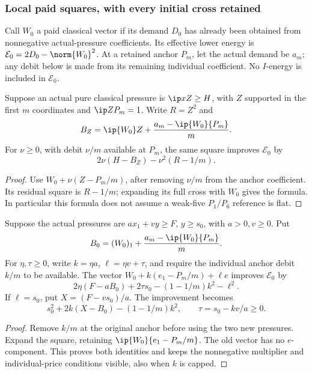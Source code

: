 \subsubsection{Local paid squares, with every initial cross retained}
Call \(W_0\) a paid classical vector if its demand \(D_0\) has already
been obtained from nonnegative actual-pressure coefficients. Its effective
lower energy is \(\mathcal E_0=2D_0-\norm{W_0}^2\).
At a retained anchor \(P_m\), let the actual demand be \(a_m\);
any debit below is made from its remaining individual coefficient.
No \(I\)-energy is included in \(\mathcal E_0\).

\begin{lemma}
\label{lem:I-head-paid-square}
Suppose an actual pure classical pressure is
\(\ip xZ\ge H\), with \(Z\) supported in the first \(m\) coordinates
and \(\ip Z{P_m}=1\). Write \(R=Z^2\) and
\[
 B_Z=\ip{W_0}Z+{a_m-\ip{W_0}{P_m}\over m}.
\]
For \(\nu\ge0\), with debit \(\nu/m\) available at \(P_m\), the
same square improves \(\mathcal E_0\) by
\[
 2\nu(H-B_Z)-\nu^2(R-1/m).
\]
\end{lemma}
\begin{proof}
Use \(W_0+\nu(Z-P_m/m)\), after removing \(\nu/m\) from the
anchor coefficient. Its residual square is \(R-1/m\); expanding its
full cross with \(W_0\) gives the formula. In particular this formula
does not assume a weak-five \(P_1/P_6\) reference is flat.
\end{proof}

\begin{lemma}
\label{lem:I-joint-paid-reference}
Suppose the actual pressures are \(a x_1+v y\ge F\), \(y\ge s_0\),
with \(a>0,v\ge0\). Put
\[
 B_0=(W_0)_1+{a_m-\ip{W_0}{P_m}\over m}.
\]
For \(\eta,\tau\ge0\), write \(k=\eta a\), \(\ell=\eta v+\tau\),
and require the individual anchor debit \(k/m\) to be available.
The vector
\(W_0+k(e_1-P_m/m)+\ell e\) improves \(\mathcal E_0\) by
\[
 2\eta(F-aB_0)+2\tau s_0-(1-1/m)k^2-\ell^2.
\]
If \(\ell=s_0\), put \(X=(F-vs_0)/a\). The improvement becomes
\[
 s_0^2+2k(X-B_0)-(1-1/m)k^2,
 \qquad \tau=s_0-kv/a\ge0.
\]
\end{lemma}
\begin{proof}
Remove \(k/m\) at the original anchor before using the two new
pressures. Expand the square, retaining
\(\ip{W_0}{e_1-P_m/m}\). The old vector has no \(e\)-component.
This proves both identities and keeps the nonnegative multiplier and
individual-price conditions visible, also when \(k\) is capped.
\end{proof}

